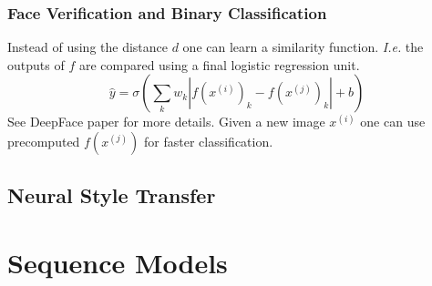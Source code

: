 \documentclass{article}
\begin{document}
\subsubsection{Face Verification and Binary Classification}
Instead of using the distance $d$ one can learn a similarity function.
\emph{I.e.} the outputs of $f$ are compared using a final logistic regression unit.
\begin{equation}
  \hat{y}=\sigma(\sum_kw_k|f(x^{(i)})_k-f(x^{(j)})_k|+b)
\end{equation}
See DeepFace paper for more details.
Given a new image $x^{(i)}$ one can use precomputed $f(x^{(j)})$ for faster classification.

\subsection{Neural Style Transfer}

\section{Sequence Models}
\end{document}
